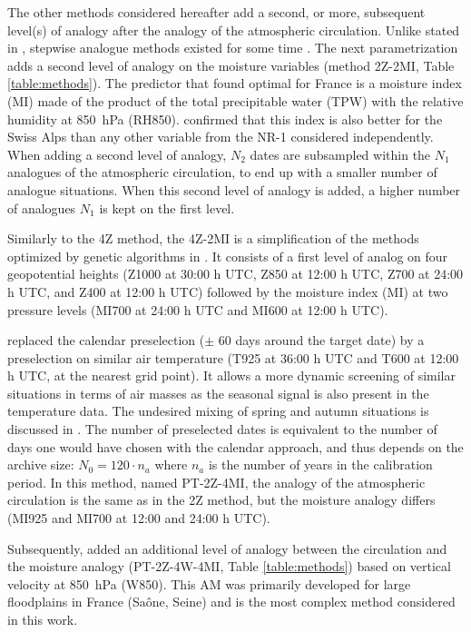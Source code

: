 \documentclass{ametsoc}
\begin{document}
The other methods considered hereafter add a second, or more, subsequent level(s) of analogy after the analogy of the atmospheric circulation. Unlike stated in \citet{Caillouet2016}, stepwise analogue methods existed for some time \citep[e.g.][]{Bontron2004, Bontron2005, Marty2010, Marty2012, Horton2012a}. The next parametrization adds a second level of analogy on the moisture variables (method 2Z-2MI, Table \ref{table:methods}). The predictor that \citet{Bontron2004} found optimal for France is a moisture index (MI) made of the product of the total precipitable water (TPW) with the relative humidity at 850~hPa (RH850). \cite{Horton2012a} confirmed that this index is also better for the Swiss Alps than any other variable from the NR-1 considered independently. When adding a second level of analogy, $N_{2}$ dates are subsampled within the $N_{1}$ analogues of the atmospheric circulation, to end up with a smaller number of analogue situations. When this second level of analogy is added, a higher number of analogues $N_{1}$ is kept on the first level. 

Similarly to the 4Z method, the 4Z-2MI is a simplification of the methods optimized by genetic algorithms in \citet{Horton2017b}. It consists of a first level of analog on four geopotential heights (Z1000 at 30:00 h UTC, Z850 at 12:00 h UTC, Z700 at 24:00 h UTC, and Z400 at 12:00 h UTC) followed by the moisture index (MI) at two pressure levels (MI700 at 24:00 h UTC and MI600 at 12:00 h UTC).

\citet{BenDaoud2016} replaced the calendar preselection ($\pm$ 60 days around the target date) by a preselection on similar air temperature (T925 at 36:00 h UTC and T600 at 12:00 h UTC, at the nearest grid point). It allows a more dynamic screening of similar situations in terms of air masses as the seasonal signal is also present in the temperature data. The undesired mixing of spring and autumn situations is discussed in \citet{Caillouet2016}. The number of preselected dates is equivalent to the number of days one would have chosen with the calendar approach, and thus depends on the archive size: $N_{0} = 120 \cdot n_{a}$ where $n_{a}$ is the number of years in the calibration period. In this method, named PT-2Z-4MI, the analogy of the atmospheric circulation is the same as in the 2Z method, but the moisture analogy differs (MI925 and MI700 at 12:00 and 24:00 h UTC).

Subsequently, \citet{BenDaoud2016} added an additional level of analogy between the circulation and the moisture analogy (PT-2Z-4W-4MI, Table \ref{table:methods}) based on vertical velocity at 850~hPa (W850). This AM was primarily developed for large floodplains in France (Sa\^{o}ne, Seine) and is the most complex method considered in this work. 
\end{document}
